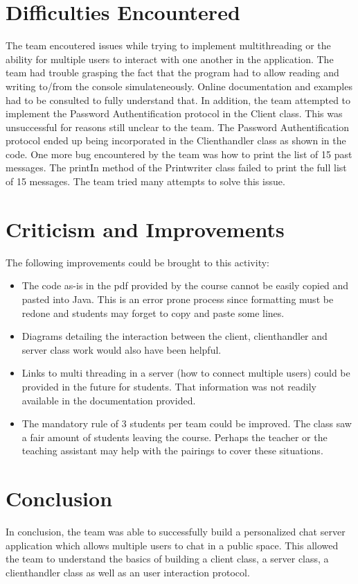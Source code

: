 \documentclass[11pt,letterpaper]{article}
\begin{document}
\section{Difficulties Encountered}
The team encoutered issues while trying to implement multithreading or the ability for multiple users to interact with one another in the application. The team had trouble grasping the fact that the program had to allow reading and writing to/from the console simulateneously. Online documentation and examples had to be consulted to fully understand that. In addition, the team attempted to implement the Password Authentification protocol in the Client class. This was unsuccessful for reasons still unclear to the team.  The Password Authentification protocol ended up being incorporated in the Clienthandler class as shown in the code. One more bug encountered by the team was how to print the list of 15 past messages. The printIn method of the Printwriter class failed to print the full list of 15 messages. The team tried many attempts to solve this issue.

\section{Criticism and Improvements}
The following improvements could be brought to this activity:
\begin{itemize}
  \item The code as-is in the pdf provided by the course cannot be easily copied and pasted into Java. This is an error prone process since formatting must be redone and students may forget to copy and paste some lines.
  \item Diagrams detailing the interaction between the client, clienthandler and server class work would also have been helpful.
  \item Links to multi threading in a server (how to connect multiple users) could be provided in the future for students. That information was not readily available in the documentation provided.
   \item The mandatory rule of 3 students per team could be improved. The class saw a fair amount of students leaving the course. Perhaps the teacher or the teaching assistant may help with the pairings to cover these situations.
\end{itemize}

\section{Conclusion}
In conclusion, the team was able to successfully build a personalized chat server application which allows multiple users to chat in a public space. This allowed the team to understand the basics of building a client class, a server class, a clienthandler class as well as an user interaction protocol.
\end{document}
